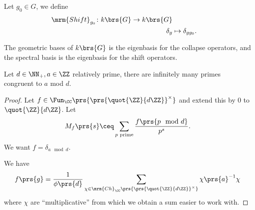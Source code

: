 \documentclass[10pt,a4paper,twoside,openany,hidelinks]{book}
\begin{document}
\begin{definition}
Let $g_0 \in G$, we define
\begin{align*}
\mrm{Shift}_{g_0} \colon k\brs{G} \to k\brs{G} \\
\delta_g &\mapsto \delta_{g g_0} \text{.}
\end{align*}
\end{definition}

\begin{fact}
The geometric bases of $k\brs{G}$ is the eigenbasis for the collapse operators, and the spectral basis is the eigenbasis for the shift operators.
\end{fact}

\begin{theorem}[Dirichlet]
Let $d \in \NN_+, a \in \ZZ$ relatively prime, there are infinitely many primes congruent to $a$ mod $d$.
\end{theorem}

\begin{proof}
Let $f \in \Fun_\CC\prs{\prs{\quot{\ZZ}{d\ZZ}}^\times}$ and extend this by $0$ to $\quot{\ZZ}{d\ZZ}$.
Let
\[M_f\prs{s} \ceq \sum_{p \text{ prime}} \frac{f\prs{p \mod d}}{p^s} \text{.}\]
We want $f = \delta_{a \mod d}$.

We have
\[f\prs{g} = \frac{1}{\phi\prs{d}} \sum_{\chi \in \mrm{Ch}_\CC\prs{\prs{\quot{\ZZ}{d\ZZ}}^\times}} \chi\prs{a}^{-1} \chi\]
where $\chi$ are ``multiplicative'' from which we obtain a sum easier to work with.
\end{proof}

\begin{comment}
\begin{thebibliography}{2}
\bibitem{context} 
Emily Riehl. 
\textit{Category Theory in Context}. 

\bibitem{nlab}
\textit{nLab - Online Wiki with Focus on Category Theory and Homotopy Theory}.\\
\href{https://ncatlab.org/nlab/show/HomePage}{https://ncatlab.org/nlab/show/HomePage}
\end{thebibliography}
\end{comment}

\backmatter
\end{document}
